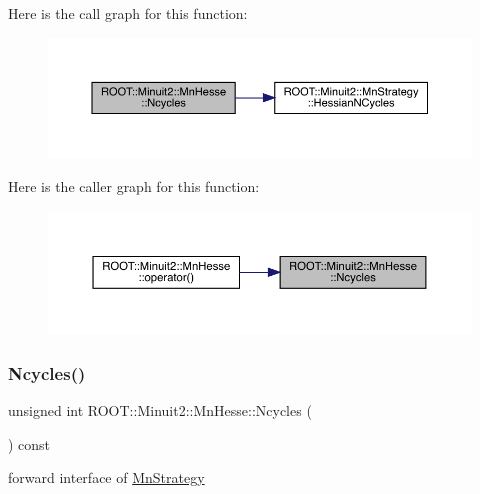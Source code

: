 Here is the call graph for this function\+:
\nopagebreak
\begin{figure}[H]
\begin{center}
\leavevmode
\includegraphics[width=350pt]{d1/d02/classROOT_1_1Minuit2_1_1MnHesse_a5a84b9459469f2edf55f28d8d579a00d_cgraph}
\end{center}
\end{figure}
Here is the caller graph for this function\+:\nopagebreak
\begin{figure}[H]
\begin{center}
\leavevmode
\includegraphics[width=350pt]{d1/d02/classROOT_1_1Minuit2_1_1MnHesse_a5a84b9459469f2edf55f28d8d579a00d_icgraph}
\end{center}
\end{figure}
\mbox{\label{classROOT_1_1Minuit2_1_1MnHesse_a5a84b9459469f2edf55f28d8d579a00d}} 
\subsubsection{\texorpdfstring{Ncycles()}{Ncycles()}\hspace{0.1cm}{\footnotesize\ttfamily [2/2]}}
{\footnotesize\ttfamily unsigned int R\+O\+O\+T\+::\+Minuit2\+::\+Mn\+Hesse\+::\+Ncycles (\begin{DoxyParamCaption}{ }\end{DoxyParamCaption}) const\hspace{0.3cm}{\ttfamily [inline]}}



forward interface of \mbox{\hyperlink{classROOT_1_1Minuit2_1_1MnStrategy}{Mn\+Strategy}} 


